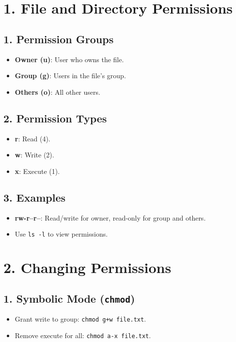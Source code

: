 \documentclass[a4paper]{report}
\begin{document}
\section*{1. File and Directory Permissions}

\subsection*{1. Permission Groups}
\begin{itemize}
    \item \textbf{Owner (u)}: User who owns the file.
    \item \textbf{Group (g)}: Users in the file's group.
    \item \textbf{Others (o)}: All other users.
\end{itemize}

\subsection*{2. Permission Types}
\begin{itemize}
    \item \textbf{r}: Read (4).
    \item \textbf{w}: Write (2).
    \item \textbf{x}: Execute (1).
\end{itemize}

\subsection*{3. Examples}
\begin{itemize}
    \item \textbf{rw-r--r--}: Read/write for owner, read-only for group and others.
    \item Use \texttt{ls -l} to view permissions.
\end{itemize}

\section*{2. Changing Permissions}

\subsection*{1. Symbolic Mode (\texttt{chmod})}
\begin{itemize}
    \item Grant write to group: \texttt{chmod g+w file.txt}.
    \item Remove execute for all: \texttt{chmod a-x file.txt}.
\end{itemize}
\end{document}
